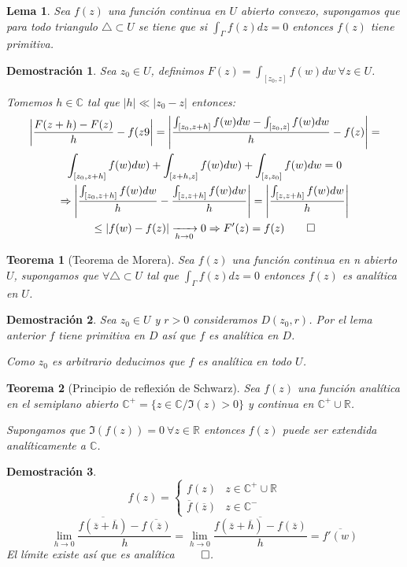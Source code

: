 \documentclass[10pt]{book}
\newtheorem{theorem}{Teorema}[chapter]
\newtheorem*{dem}{Demostración}
\newtheorem{lema}{Lema}[chapter]
\newcommand{\R}{\mathbb{R}}
\newcommand{\C}{\mathbb{C}}
\begin{document}
\begin{lema}
Sea $f(z)$ una función continua en $U$ abierto convexo, supongamos que para todo triangulo $\triangle \subset U$ se tiene que si $\int_\Gamma f(z)dz =0$ entonces $f(z)$ tiene primitiva.
\end{lema}

\begin{dem}
Sea $z_0 \in U$, definimos $F(z) = \int_{[z_0,z]} f(w)dw \ \forall z\in U$.

Tomemos $h \in \C$ tal que $|h| \ll |z_0-z|$ entonces:
\begin{multline*}
\left|  \frac{F(z+h)-F(z)}{h}-f(z9\right| = \left|  \frac{\int_{[z_0,z+h]}f(w)dw -\int_{[z_0,z]}f(w)dw}{h}-f(z)\right| =\\
 \int_{[z_0,z+h]}f(w)dw) + \int_{[z+h,z]}f(w)dw)+\int_{[z,z_0]}f(w)dw = 0\\
\Rightarrow \left|  \frac{\int_{[z_0,z+h]}f(w)dw}{h} - \frac{\int_{[z,z+h]}f(w)dw}{h}\right| = \left|  \frac{\int_{[z,z+h]}f(w)dw}{h}\right| \\
\leq |f(w)-f(z)| \xrightarrow[h\to 0]{} 0 \Rightarrow F'(z) = f(z) \qed
\end{multline*}
\end{dem}


\begin{theorem}[Teorema de Morera]
Sea $f(z)$ una función continua en n abierto $U$, supongamos que $\forall \triangle \subset U$ tal que $\int_\Gamma f(z)dz =0$ entonces $f(z)$ es analítica en $U$.
\end{theorem}

\begin{dem}
Sea $z_0\in U$ y $r>0$ consideramos $D(z_0,r)$. Por el lema anterior $f$ tiene primitiva en $D$ así que $f$ es analítica en $D$.

Como $z_0$ es arbitrario deducimos que $f$ es analítica en todo $U$.
\end{dem}

\begin{theorem}[Principio de reflexión de Schwarz]
Sea $f(z)$ una función analítica en el semiplano abierto $\C^+ = \{z\in\C / \Im(z) >0\}$ y continua en $\C^+ \cup \R$.

Supongamos que $\Im(f(z)) = 0\ \forall z\in \R$ entonces $f(z)$ puede ser extendida analíticamente a $\C$.
\end{theorem}

\begin{dem}
$$
f(z) = \left\{\begin{array}{cc} f(z) &z\in \C^+ \cup \R \\
						\overline{f}(\overline{z}) &z\in\C^-
		\end{array}\right.
$$$$
\lim_{h\to 0} \frac{\overline{f(\overline{z}+\overline{h})}-\overline{f(\overline{z})}}{h} = \lim_{h\to 0} \frac{\overline{f(\overline{z}+\overline{h})-f(\overline{z})}}{h} = \overline{f'(w)} 
$$
El límite existe así que es analítica $\qed$.
\end{dem}
\end{document}
